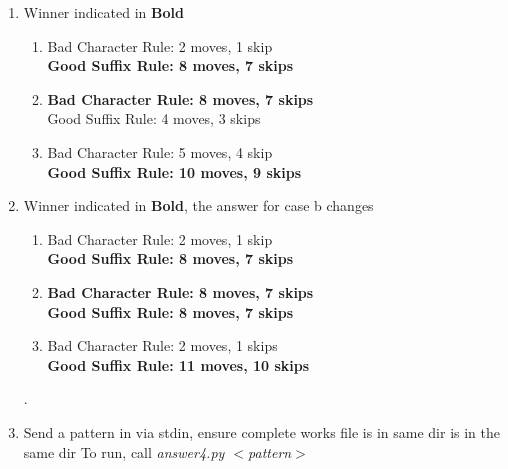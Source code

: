 \documentclass[12pt]{article}
\begin{document}
\begin{enumerate}
\begin{enumerate}[label=(\alph*)]
        
    \end{enumerate}
    \item Winner indicated in \textbf{Bold}
    \begin{enumerate}[label=(\alph*)]
        \item 
        Bad Character Rule: 2 moves, 1 skip
         \\ \textbf{Good Suffix Rule: 8 moves, 7 skips}
        \item
        \textbf{Bad Character Rule: 8 moves, 7 skips}
        \\ Good Suffix Rule: 4 moves, 3 skips
        \item
        Bad Character Rule: 5 moves, 4 skip 
        \\ \textbf{Good Suffix Rule: 10 moves, 9 skips}
    \end{enumerate}
    \item Winner indicated in \textbf{Bold}, the answer for case b changes
    \begin{enumerate}[label=(\alph*)]
        \item 
        Bad Character Rule: 2 moves, 1 skip
         \\ \textbf{Good Suffix Rule: 8 moves, 7 skips}
        \item
        \textbf{Bad Character Rule: 8 moves, 7 skips}
        \\ \textbf{Good Suffix Rule: 8 moves, 7 skips}
        \item
        Bad Character Rule: 2 moves, 1 skips 
        \\ \textbf{Good Suffix Rule: 11 moves, 10 skips}
    \end{enumerate}.
    \item Send a pattern in via stdin, ensure complete works file is in same dir is in the same dir To run, call 
    \textit{answer4.py $<$pattern$>$}
\end{enumerate}



\end{document}
